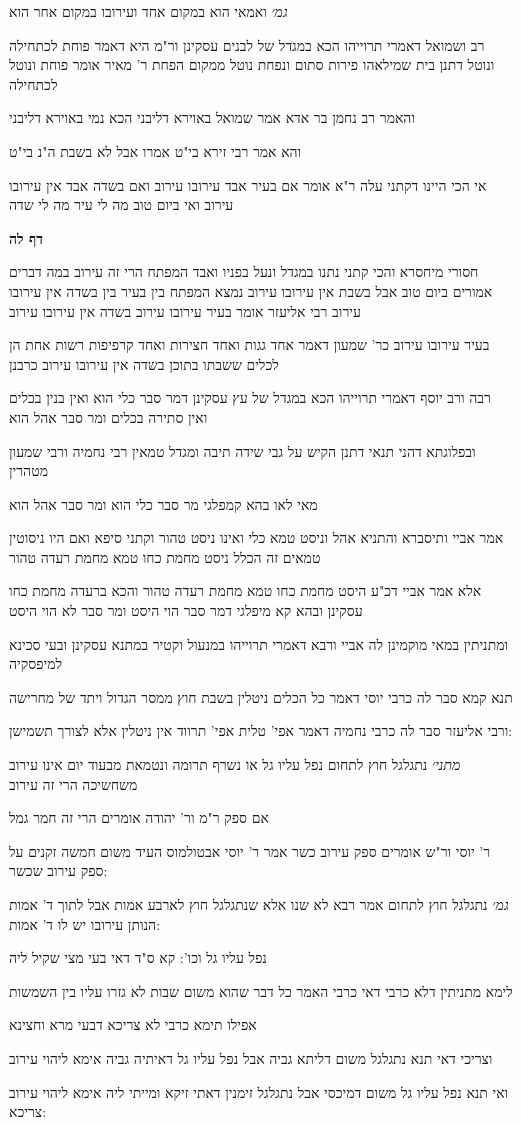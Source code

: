 \documentclass[12pt, openany]{book}
\newcommand{\sethebfont}{
\fontsize{10.5pt}{21.0pt} \selectfont
}
\newcommand{\textblock}[1]{
{\sethebfont #1\\}	
}
\newcommand{\sectname}{}
\newcommand{\newsection}[1]{
	\addcontentsline{toc}{section}{#1}
	\renewcommand{\sectname}{#1}	
	\vspace{-\baselineskip}
	\begin{center}
		\textbf{%
\fontsize{16pt}{16pt}\selectfont
			#1}
	\end{center}
	\vspace{-\baselineskip}
	\nopagebreak
}
\begin{document}
\textblock{{\large\emph{גמ׳}} ואמאי הוא במקום אחד ועירובו במקום אחר הוא}
\textblock{רב ושמואל דאמרי תרוייהו הכא במגדל של לבנים עסקינן ור"מ היא דאמר פוחת לכתחילה ונוטל דתנן בית שמילאהו פירות סתום ונפחת נוטל ממקום הפחת ר' מאיר אומר פוחת ונוטל לכתחילה}
\textblock{והאמר רב נחמן בר אדא אמר שמואל באוירא דליבני הכא נמי באוירא דליבני}
\textblock{והא אמר רבי זירא בי"ט אמרו אבל לא בשבת ה"נ בי"ט}
\textblock{אי הכי היינו דקתני עלה ר"א אומר אם בעיר אבד עירובו עירוב ואם בשדה אבד אין עירובו עירוב ואי ביום טוב מה לי עיר מה לי שדה}
\newsection{דף לה}
\textblock{חסורי מיחסרא והכי קתני נתנו במגדל ונעל בפניו ואבד המפתח הרי זה עירוב במה דברים אמורים ביום טוב אבל בשבת אין עירובו עירוב נמצא המפתח בין בעיר בין בשדה אין עירובו עירוב רבי אליעזר אומר בעיר עירובו עירוב בשדה אין עירובו עירוב}
\textblock{בעיר עירובו עירוב כר' שמעון דאמר אחד גגות ואחד חצירות ואחד קרפיפות רשות אחת הן לכלים ששבתו בתוכן בשדה אין עירובו עירוב כרבנן}
\textblock{רבה ורב יוסף דאמרי תרוייהו הכא במגדל של עץ עסקינן דמר סבר כלי הוא ואין בנין בכלים ואין סתירה בכלים ומר סבר אהל הוא}
\textblock{ובפלוגתא דהני תנאי דתנן הקיש על גבי שידה תיבה ומגדל טמאין רבי נחמיה ורבי שמעון מטהרין}
\textblock{מאי לאו בהא קמפלגי מר סבר כלי הוא ומר סבר אהל הוא}
\textblock{אמר אביי ותיסברא והתניא אהל וניסט טמא כלי ואינו ניסט טהור וקתני סיפא ואם היו ניסוטין טמאים זה הכלל ניסט מחמת כחו טמא מחמת רעדה טהור}
\textblock{אלא אמר אביי דכ"ע היסט מחמת כחו טמא מחמת רעדה טהור והכא ברעדה מחמת כחו עסקינן ובהא קא מיפלגי דמר סבר הוי היסט ומר סבר לא הוי היסט}
\textblock{ומתניתין במאי מוקמינן לה אביי ורבא דאמרי תרוייהו במנעול וקטיר במתנא עסקינן ובעי סכינא למיפסקיה}
\textblock{תנא קמא סבר לה כרבי יוסי דאמר כל הכלים ניטלין בשבת חוץ ממסר הגדול ויתד של מחרישה}
\textblock{ורבי אליעזר סבר לה כרבי נחמיה דאמר אפי' טלית אפי' תרווד אין ניטלין אלא לצורך תשמישן:}
\textblock{{\large\emph{מתני׳}} נתגלגל חוץ לתחום נפל עליו גל או נשרף תרומה ונטמאת מבעוד יום אינו עירוב משחשיכה הרי זה עירוב}
\textblock{אם ספק ר"מ ור' יהודה אומרים הרי זה חמר גמל}
\textblock{ר' יוסי ור"ש אומרים ספק עירוב כשר אמר ר' יוסי אבטולמוס העיד משום חמשה זקנים על ספק עירוב שכשר:}
\textblock{{\large\emph{גמ׳}} נתגלגל חוץ לתחום אמר רבא לא שנו אלא שנתגלגל חוץ לארבע אמות אבל לתוך ד' אמות הנותן עירובו יש לו ד' אמות:}
\textblock{נפל עליו גל וכו': קא ס"ד דאי בעי מצי שקיל ליה}
\textblock{לימא מתניתין דלא כרבי דאי כרבי האמר כל דבר שהוא משום שבות לא גזרו עליו בין השמשות}
\textblock{אפילו תימא כרבי לא צריכא דבעי מרא וחצינא}
\textblock{וצריכי דאי תנא נתגלגל משום דליתא גביה אבל נפל עליו גל דאיתיה גביה אימא ליהוי עירוב}
\textblock{ואי תנא נפל עליו גל משום דמיכסי אבל נתגלגל זימנין דאתי זיקא ומייתי ליה אימא ליהוי עירוב צריכא:}
\end{document}
